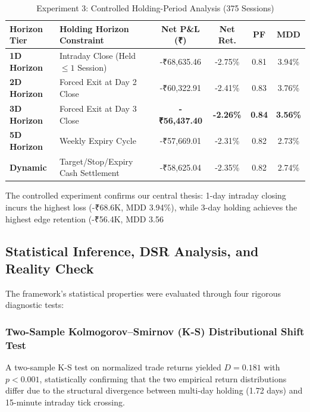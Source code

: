 \documentclass[journal]{IEEEtran}
\begin{document}
\begin{table}[!t]
\renewcommand{\arraystretch}{1.15}
\caption{Experiment 3: Controlled Holding-Period Analysis (375 Sessions)}
\label{tab:exp3_holding}
\centering
\scriptsize
\begin{tabular}{llcccc}
\toprule
\textbf{Horizon Tier} & \textbf{Holding Horizon Constraint} & \textbf{Net P\&L (₹)} & \textbf{Net Ret.} & \textbf{PF} & \textbf{MDD} \\
\midrule
\textbf{1D Horizon} & Intraday Close (Held $\le 1$ Session) & -₹68,635.46 & -2.75\% & 0.81 & 3.94\% \\
\textbf{2D Horizon} & Forced Exit at Day 2 Close & -₹60,322.91 & -2.41\% & 0.83 & 3.76\% \\
\textbf{3D Horizon} & Forced Exit at Day 3 Close & \textbf{-₹56,437.40} & \textbf{-2.26\%} & \textbf{0.84} & \textbf{3.56\%} \\
\textbf{5D Horizon} & Weekly Expiry Cycle & -₹57,669.01 & -2.31\% & 0.82 & 2.73\% \\
\textbf{Dynamic}    & Target/Stop/Expiry Cash Settlement & -₹58,625.04 & -2.35\% & 0.82 & 2.74\% \\
\bottomrule
\end{tabular}
\end{table}

The controlled experiment confirms our central thesis: 1-day intraday closing incurs the highest loss (-₹68.6K, MDD 3.94\%), while 3-day holding achieves the highest edge retention (-₹56.4K, MDD 3.56%

\subsection{Statistical Inference, DSR Analysis, and Reality Check}

The framework's statistical properties were evaluated through four rigorous diagnostic tests:

\subsubsection{Two-Sample Kolmogorov--Smirnov (K-S) Distributional Shift Test}
A two-sample K-S test on normalized trade returns yielded $D = 0.181$ with $p < 0.001$, statistically confirming that the two empirical return distributions differ due to the structural divergence between multi-day holding (1.72 days) and 15-minute intraday tick crossing.
\end{document}
